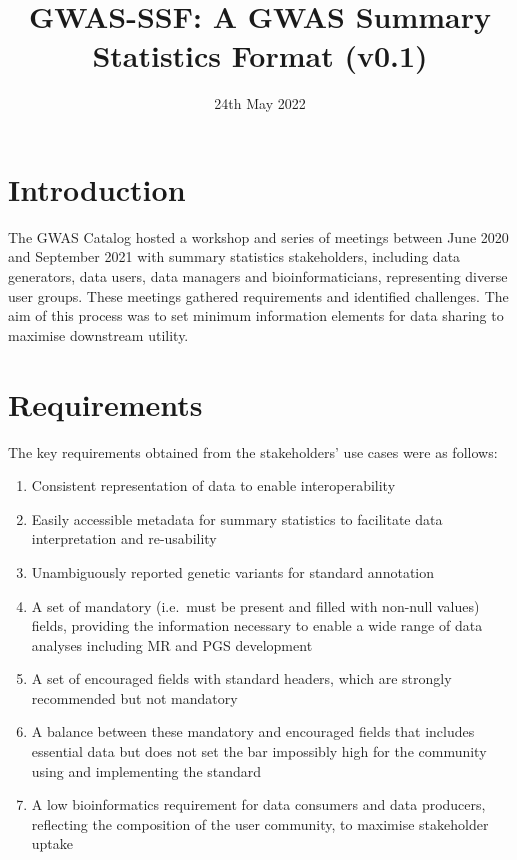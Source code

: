 \documentclass[11pt]{article}
\title{GWAS-SSF: A GWAS Summary Statistics Format (v0.1)}
\date{24th May 2022}
\begin{document}
\maketitle

\newpage
\tableofcontents

\newpage

\section{Introduction}
The GWAS Catalog hosted a workshop and series of meetings between June 2020 and September 2021 with summary statistics stakeholders, including data generators, data users, data managers and bioinformaticians, representing diverse user groups. These meetings gathered requirements and identified challenges. The aim of this process was to set minimum information elements for data sharing to maximise downstream utility.

\section{Requirements}

The key requirements obtained from the stakeholders’ use cases were as follows:

\begin{enumerate}
\item Consistent representation of data to enable interoperability
\item Easily accessible metadata for summary statistics to facilitate data interpretation and re-usability
\item Unambiguously reported genetic variants for standard annotation
\item A set of mandatory (i.e.\ must be present and filled with non-null values) fields, providing the information necessary to enable a wide range of data analyses including MR and PGS development
\item A set of encouraged fields with standard headers, which are strongly recommended but not mandatory 
\item A balance between these mandatory and encouraged fields that includes essential data but does not set the bar impossibly high for the community using and implementing the standard
\item A low bioinformatics requirement for data consumers and data producers, reflecting the composition of the user community, to maximise stakeholder uptake 
\end{enumerate}
\end{document}
